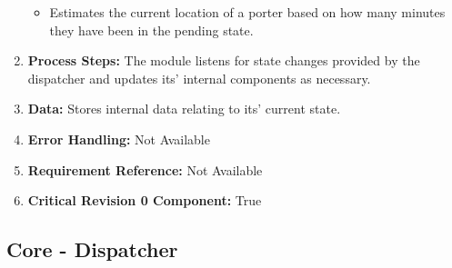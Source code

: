 \documentclass[paper=letter, fontsize=10pt]{scrartcl}
\numberwithin{equation}{section}		%
\numberwithin{figure}{section}			%
\numberwithin{table}{section}				%
\begin{document}
\begin{enumerate}[]
\begin{itemize}
			\item Estimates the current location of a porter based on how many minutes they have been in the pending state.
		\end{itemize}
	\item \textbf{Process Steps:} The module listens for state changes provided by the dispatcher and updates its' internal components as necessary.
	\item \textbf{Data:} Stores internal data relating to its' current state.
	\item \textbf{Error Handling:} Not Available
	\item \textbf{Requirement Reference:} Not Available
	\item \textbf{Critical Revision 0 Component:} True
\end{enumerate}
\subsection{Core - Dispatcher}
\end{document}
